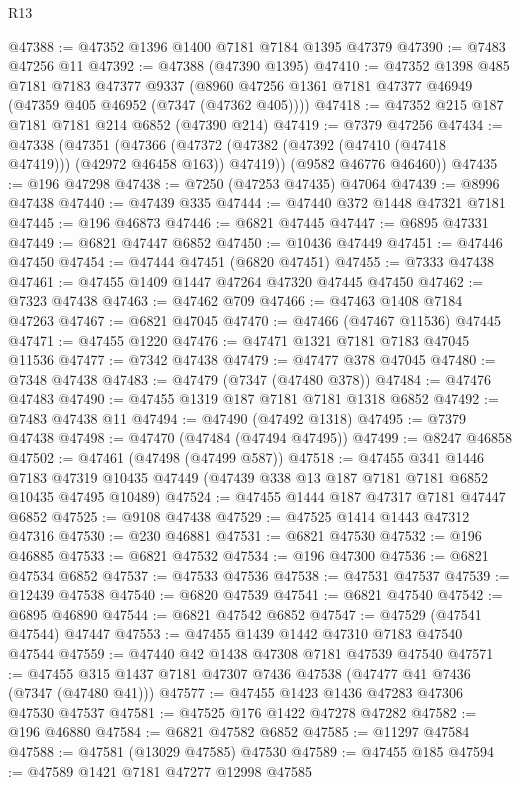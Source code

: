 \begin{lexlean}{R13}
\begin{coremodule}
@47388 := @47352 @1396 @1400 @7181 @7184 @1395 @47379
@47390 := @7483 @47256 @11
@47392 := @47388 (@47390 @1395)
@47410 := @47352
    @1398
    @485
    @7181
    @7183
    @47377
    @9337
    (@8960 @47256 @1361 @7181 @47377 @46949 (@47359 @405 @46952 (@7347 (@47362 @405))))
@47418 := @47352 @215 @187 @7181 @7181 @214 @6852 (@47390 @214)
@47419 := @7379 @47256
@47434 := @47338
    (@47351
      (@47366 (@47372 (@47382 (@47392 (@47410 (@47418 @47419))) (@42972 @46458 @163)) @47419))
      (@9582 @46776 @46460))
@47435 := @196 @47298
@47438 := @7250 (@47253 @47435) @47064
@47439 := @8996 @47438
@47440 := @47439 @335
@47444 := @47440 @372 @1448 @47321 @7181
@47445 := @196 @46873
@47446 := @6821 @47445
@47447 := @6895 @47331
@47449 := @6821 @47447 @6852
@47450 := @10436 @47449
@47451 := @47446 @47450
@47454 := @47444 @47451 (@6820 @47451)
@47455 := @7333 @47438
@47461 := @47455 @1409 @1447 @47264 @47320 @47445 @47450
@47462 := @7323 @47438
@47463 := @47462 @709
@47466 := @47463 @1408 @7184 @47263
@47467 := @6821 @47045
@47470 := @47466 (@47467 @11536) @47445
@47471 := @47455 @1220
@47476 := @47471 @1321 @7181 @7183 @47045 @11536
@47477 := @7342 @47438
@47479 := @47477 @378 @47045
@47480 := @7348 @47438
@47483 := @47479 (@7347 (@47480 @378))
@47484 := @47476 @47483
@47490 := @47455 @1319 @187 @7181 @7181 @1318 @6852
@47492 := @7483 @47438 @11
@47494 := @47490 (@47492 @1318)
@47495 := @7379 @47438
@47498 := @47470 (@47484 (@47494 @47495))
@47499 := @8247 @46858
@47502 := @47461 (@47498 (@47499 @587))
@47518 := @47455
    @341
    @1446
    @7183
    @47319
    @10435
    @47449
    (@47439 @338 @13 @187 @7181 @7181 @6852 @10435 @47495 @10489)
@47524 := @47455 @1444 @187 @47317 @7181 @47447 @6852
@47525 := @9108 @47438
@47529 := @47525 @1414 @1443 @47312 @47316
@47530 := @230 @46881
@47531 := @6821 @47530
@47532 := @196 @46885
@47533 := @6821 @47532
@47534 := @196 @47300
@47536 := @6821 @47534 @6852
@47537 := @47533 @47536
@47538 := @47531 @47537
@47539 := @12439 @47538
@47540 := @6820 @47539
@47541 := @6821 @47540
@47542 := @6895 @46890
@47544 := @6821 @47542 @6852
@47547 := @47529 (@47541 @47544) @47447
@47553 := @47455 @1439 @1442 @47310 @7183 @47540 @47544
@47559 := @47440 @42 @1438 @47308 @7181 @47539 @47540
@47571 := @47455 @315 @1437 @7181 @47307 @7436 @47538 (@47477 @41 @7436 (@7347 (@47480 @41)))
@47577 := @47455 @1423 @1436 @47283 @47306 @47530 @47537
@47581 := @47525 @176 @1422 @47278 @47282
@47582 := @196 @46880
@47584 := @6821 @47582 @6852
@47585 := @11297 @47584
@47588 := @47581 (@13029 @47585) @47530
@47589 := @47455 @185
@47594 := @47589 @1421 @7181 @47277 @12998 @47585

\end{coremodule}
\end{lexlean}
